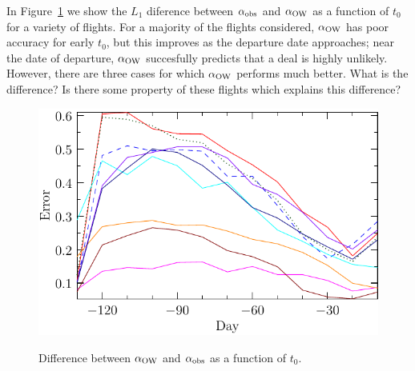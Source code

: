 \documentclass{article}
\def\aow{\alpha_{\rm{OW}}}
\def\aobs{\alpha_{\rm{obs}}}
\begin{document}
In Figure~\ref{plotA0} we show the $L_1$ diference between $\aobs$ and
$\aow$ as a function of $t_0$ for a variety of flights.  For a
majority of the flights considered, $\aow$ has poor accuracy for early
$t_0$, but this improves as the departure date approaches; near the
date of departure, $\aow$ succesfully predicts that a deal is highly
unlikely.  However, there are three cases for which $\aow$ performs
much better.  What is the difference?  Is there some property of these
flights which explains this difference?
\begin{figure}
  \begin{center}
    \includegraphics{pdf/plotA0}
    \label{plotA0}
    \caption{Difference between $\alpha_{\rm{OW}}$ and
      $\alpha_{\rm{obs}}$ as a function of $t_0$.}
  \end{center}
\end{figure}
\end{document}
